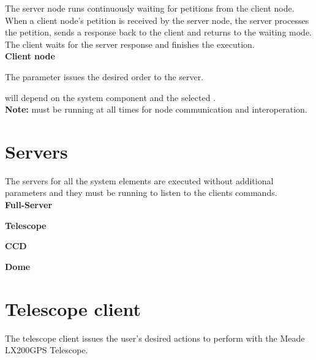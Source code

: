 \documentclass[a4paper,english]{article}
\begin{document}
The server node runs continuously waiting for petitions from the client node. When a client node's petition is received by the server node, the server processes the petition, sends a response back to the client and returns to the waiting mode. The client waits for the server response and finishes the execution. \\

\noindent
\textbf{Client node}

The  parameter issues the desired order to the server.

 will depend on the system component and the selected . \\

\noindent
\textbf{Note:}  must be running at all times for node communication and interoperation.


\section{Servers}

The servers for all the system elements are executed without additional parameters and they must be running to listen to the clients commands. \\

\noindent
\textbf{Full-Server}

  

\noindent
\textbf{Telescope}

  

\noindent
\textbf{CCD}

  

\noindent
\textbf{Dome}

  


\section{Telescope client}

The telescope client issues the user's desired actions to perform with the Meade LX200GPS Telescope. \\

     

     \\
\end{document}
